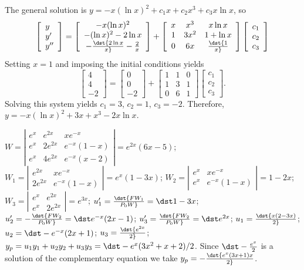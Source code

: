 \documentclass[dvips]{book}
\renewcommand{\exer}[1]{\par\medskip\;\noindent{\color{red}\bf #1.}}
\numberwithin{example}{section}
\numberwithin{equation}{section}
\numberwithin{theorem}{section}
\numberwithin{table}{section}
\numberwithin{figure}{section}
\newcommand{\threecol}[3]{\left[\begin{array}{r}#1\\#2\\#3\end{array}\right]}
\newcommand{\threebythree}[9]{\left[\begin{array}{rrr}
#1&#2&#3\\#4&#5&#6\\#7&#8&#9\end{array}\right]}
\begin{document}
The general solution is $y=-x(\ln x)^2+c_1x+c_2x^3+c_3x\ln x$,
so
$$
\left[\begin{array}{l}y\\y'\\y''
\end{array}\right]=
\left[\begin{array}{c}
-x(\ln x)^2\\ -(\ln x)^2-2\ln x\\-\dst{2\ln x\over x}-{2\over x}
\end{array}\right]+
\left[\begin{array}{cccc}
x&x^3&x\ln x\\1&3x^2&1+\ln x\\0&6x&\dst{1\over x}
\end{array}\right]
\left[\begin{array}{ccccccc}
c_{1}\\ c_{2}\\ c_{3}
\end{array}\right]
$$
Setting $x=1$ and imposing the initial conditions yields
$$
\threecol44{-2}=
\threecol00{-2}+\threebythree110131061\threecol{c_1}{c_2}{c_3}.
$$
Solving this system yields $c_1=3$, $c_2=1$, $c_3=-2$.
Therefore,$y=-x(\ln x)^2+3x+x^3-2x\ln x$.


\exer{9.4.24}
$W=\left|\begin{array}{cccc}
e^x&e^{2x}&xe^{-x}\\e^x&2e^{2x}&e^{-x}(1-x)\\e^x&4e^{2x}&e
^{-x}(x-2)\end{array}\right|=e^{2x}(6x-5)$;
$W_1=\left|\begin{array}{cccc}
e^{2x}&xe^{-x}\\2e^{2x}&e^{-x}(1-x)\end{array}\right|=e^x(1-3x)$;
$W_2=\left|\begin{array}{cccc}
e^x&xe^{-x}\\e^x&e^{-x}(1-x)\end{array}\right|=1-2x$;
$W_3=\left|\begin{array}{cccc}
e^x&e^{2x}\\e^x&2e^{2x}\end{array}\right|=e^{3x}$;
$u_1'=\dst{FW_1\over P_0W}=\dst1-3x$;
$u_2'=-\dst{FW_2\over P_0W}=\dst e^{-x}(2x-1)$;
$u_3'=\dst{FW_2\over P_0W}=\dst e^{2x}$;
$u_1=\dst {x(2-3x)\over 2}$;
$u_2=\dst -e^{-x}(2x+1)$;
$u_3=\dst {e^{2x}\over 2}$;
$y_p=u_1y_1+u_2y_2+u_3y_3=\dst-e^x(3x^2+x+2)/2$. Since
$\dst-{e^x\over2}$ is a solution of the complementary equation
we take $y_p=-\dst{e^x(3x+1)x\over2}$.
\end{document}
